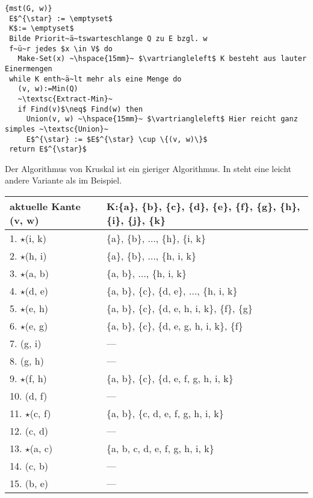 \documentclass[ngerman,draft,parskip=half*,twoside]{scrreprt}
\theoremstyle{break}
\theoremstyle{nonumberbreak}
\begin{document}
\begin{Algorithmus}[H]
\begin{lstlisting}[frame=tlrb, mathescape=true, title=\textsc{mst\textnormal{(G, w)}}, gobble=1]{mst(G, w)}
 E$^{\star} := \emptyset$
 K$:= \emptyset$
 Bilde Priorit~ä~tswarteschlange Q zu E bzgl. w
 f~ü~r jedes $x \in V$ do
   Make-Set(x) ~\hspace{15mm}~ $\vartriangleleft$ K besteht aus lauter Einermengen
 while K enth~ä~lt mehr als eine Menge do
   (v, w):=Min(Q)
   ~\textsc{Extract-Min}~
   if Find(v)$\neq$ Find(w) then
     Union(v, w) ~\hspace{15mm}~ $\vartriangleleft$ Hier reicht ganz simples ~\textsc{Union}~
     E$^{\star} := $E$^{\star} \cup \{(v, w)\}$
 return E$^{\star}$   
\end{lstlisting}
Der Algorithmus von Kruskal ist ein gieriger Algorithmus. In \cite{cormen} steht eine leicht andere Variante als im
Beispiel.
\end{Algorithmus}

\begin{tabular}{|l|l|}
aktuelle Kante (v, w) & K:\{a\}, \{b\}, \{c\}, \{d\}, \{e\}, \{f\}, \{g\}, \{h\}, \{i\}, \{j\}, \{k\}\\
\hline
1.  $\star$(i, k) & \{a\}, \{b\}, $\ldots$, \{h\}, \{i, k\}\\
2.  $\star$(h, i) & \{a\}, \{b\}, $\ldots$, \{h, i, k\}\\
3.  $\star$(a, b) & \{a, b\}, $\ldots$, \{h, i, k\}\\
\hline
4.  $\star$(d, e) & \{a, b\}, \{c\}, \{d, e\}, $\ldots$, \{h, i, k\}\\
5.  $\star$(e, h) & \{a, b\}, \{c\}, \{d, e, h, i, k\}, \{f\}, \{g\}\\
6.  $\star$(e, g) & \{a, b\}, \{c\}, \{d, e, g, h, i, k\}, \{f\}\\
\hline
7.  (g, i) & ---\\
8.  (g, h) & ---\\
9.  $\star$(f, h) & \{a, b\}, \{c\}, \{d, e, f, g, h, i, k\}\\
\hline
10.  (d, f) & ---\\
11.  $\star$(c, f) & \{a, b\}, \{c, d, e, f, g, h, i, k\}\\
12.  (c, d) & ---\\
\hline
13.  $\star$(a, c) & \{a, b, c, d, e, f, g, h, i, k\}\\
14.  (c, b) & ---\\
15.  (b, e) & ---\\
\end{tabular}
\end{document}
